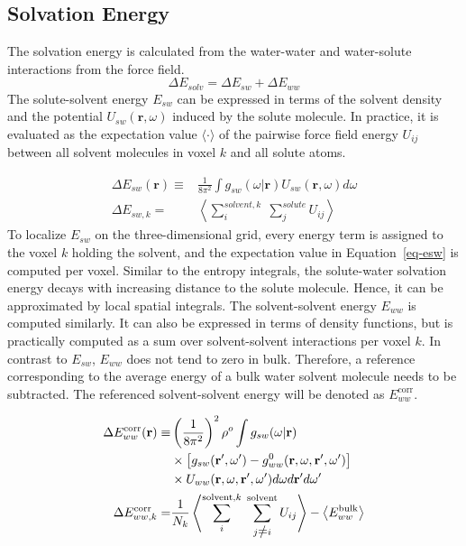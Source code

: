\documentclass[9pt,tutorial]{livecoms}
\renewcommand{\neq}{\setbox0\hbox{=}\rlap{\hbox to \wd0{\hss /\hss}}\box0}
\begin{document}
\subsection{Solvation Energy}
The solvation energy is calculated from the water-water and water-solute interactions from the force field.
\begin{equation}
	\Delta E_\textit{solv} = \Delta E_\textit{sw} + \Delta E_\textit{ww}
\end{equation}
The solute-solvent energy $E_{sw}$ can be expressed in terms of the solvent density and the potential $U_{sw}(\textbf{r},\omega)$ induced by the solute molecule.
In practice, it is evaluated as the expectation value $\langle\cdot\rangle$ of the pairwise force field energy $U_{ij}$ between all solvent molecules in voxel $k$ and all solute atoms.

\begin{equation}
	\begin{aligned}
		\label{eq-esw}
		\Delta E_{sw}(\textbf{r}) \equiv& \frac{1}{8\pi^2} \int g_\textit{sw}\left(\omega|\textbf{r}\right) U_\textit{sw}\left(\textbf{r}, \omega\right) d\omega \\
		\Delta E_{sw,k}=& \left\langle \sum_i^{\textit{solvent},k} \; \sum_j^\textit{solute} U_{ij}\right\rangle
	\end{aligned}
\end{equation}
To localize $E_{sw}$ on the three-dimensional grid, every energy term is assigned to the voxel $k$ holding the solvent, and the expectation value in Equation~\ref{eq-esw} is computed per voxel.
Similar to the entropy integrals, the solute-water solvation energy decays with increasing distance to the solute molecule.
Hence, it can be approximated by local spatial integrals. 
The solvent-solvent energy $E_{ww}$ is computed similarly.
It can also be expressed in terms of density functions, but is practically computed as a sum over solvent-solvent interactions per voxel $k$.
In contrast to $E_{sw}$, $E_{ww}$ does not tend to zero in bulk.
Therefore, a reference corresponding to the average energy of a bulk water solvent molecule needs to be subtracted.
The referenced solvent-solvent energy will be denoted as $E_{ww}^\text{corr}$.

\begin{equation}
	\begin{aligned}
		\Delta E_{ww}^\text{corr}(\textbf{r}) \equiv & \left(\frac{1}{8\pi^2} \right)^2 \rho^o \int g_{sw}(\omega|\textbf{r}) \\
			& \times \left[g_{sw}(\textbf{r}^\prime , \omega^\prime) - g^0_{ww} (\textbf{r}, \omega, \textbf{r}^\prime, \omega^\prime )\right] \\
			& \times U_{ww}(\textbf{r}, \omega, \textbf{r}^\prime, \omega^\prime)d\omega d\textbf{r}^\prime d\omega^\prime \\
		\Delta E_{ww,k}^\text{corr} =& \frac{1}{N_k} \left\langle \sum_i^{\text{solvent},k} \; \sum_{j \neq i}^\text{solvent} U_{ij}\right\rangle - \left\langle E_{ww}^\text{bulk}\right\rangle
	\end{aligned}
\end{equation}
\end{document}
